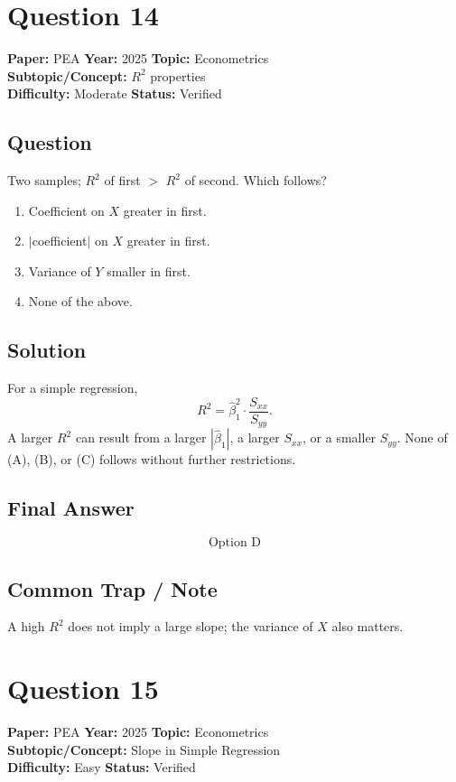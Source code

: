 \documentclass[11pt]{article}
\begin{document}
\section*{Question 14}
\textbf{Paper:} PEA \quad \textbf{Year:} 2025 \quad \textbf{Topic:} Econometrics \\
\textbf{Subtopic/Concept:} $R^2$ properties \\
\textbf{Difficulty:} Moderate \quad \textbf{Status:} Verified

\subsection*{Question}
Two samples; $R^2$ of first $>$ $R^2$ of second. Which follows?
\begin{enumerate}[label=(\Alph*)]
\item Coefficient on $X$ greater in first.
\item $|$coefficient$|$ on $X$ greater in first.
\item Variance of $Y$ smaller in first.
\item None of the above.
\end{enumerate}

\subsection*{Solution}
For a simple regression,
\[
R^2 = \hat\beta_1^2 \cdot \frac{S_{xx}}{S_{yy}}.
\]
A larger $R^2$ can result from a larger $|\hat\beta_1|$, a larger $S_{xx}$, or a smaller $S_{yy}$. None of (A), (B), or (C) follows without further restrictions.

\subsection*{Final Answer}
\[
\boxed{\text{Option D}}
\]

\subsection*{Common Trap / Note}
A high $R^2$ does not imply a large slope; the variance of $X$ also matters.

\section*{Question 15}
\textbf{Paper:} PEA \quad \textbf{Year:} 2025 \quad \textbf{Topic:} Econometrics \\
\textbf{Subtopic/Concept:} Slope in Simple Regression \\
\textbf{Difficulty:} Easy \quad \textbf{Status:} Verified
\end{document}
